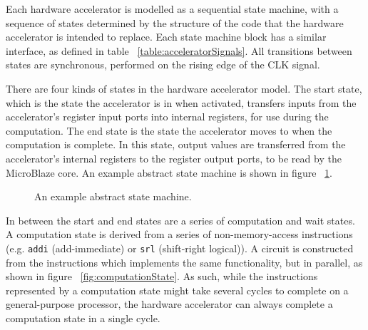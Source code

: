 \documentclass{UoYCSproject}
\begin{document}
Each hardware accelerator is modelled as a sequential state machine, with a sequence of states determined by the structure
of the code that the hardware accelerator is intended to replace. Each state machine block has a similar interface, as defined in
table ~\ref{table:acceleratorSignals}. All transitions between states are synchronous, performed on the rising edge of the CLK
signal.

There are four kinds of states in the hardware accelerator model. The start state, which is the state the accelerator is in
when activated, transfers inputs from the accelerator's register input ports into internal registers, for use during the
computation. The end state is the state the accelerator moves to when the computation is complete. In this state, output values
are transferred from the accelerator's internal registers to the register output ports, to be read by the MicroBlaze core.
An example abstract state machine is shown in figure ~\ref{fig:abstractStateMachine}.

\begin{figure}[H]
\centering
{}
\caption{An example abstract state machine.}
\label{fig:abstractStateMachine}
\end{figure}

In between the start and end states are a series of computation and wait states. A computation state is derived from a series of
non-memory-access instructions (e.g. \texttt{addi} (add-immediate) or \texttt{srl} (shift-right logical)).
A circuit is constructed from the instructions which implements the same functionality, but in parallel,
as shown in figure ~\ref{fig:computationState}. As such, while the instructions represented by a computation state might take
several cycles to complete on a general-purpose processor, the hardware accelerator can always complete a computation state in a
single cycle.
\end{document}
